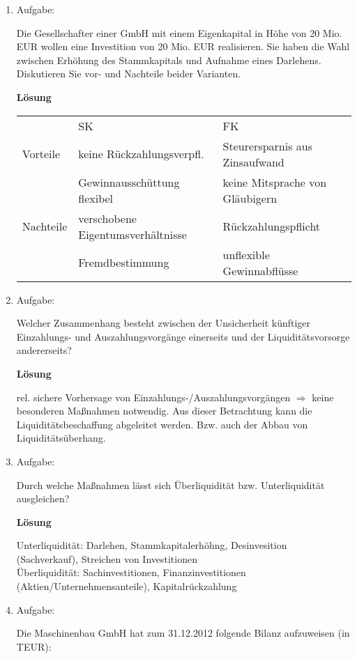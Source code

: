 \documentclass[12pt,a4paper]{scrreprt}
\newcommand{\Lsg}{\textbf{Lösung}\nobreak}
\begin{document}
\begin{enumerate}
 	\item{Aufgabe:}

Die Gesellschafter einer GmbH mit einem Eigenkapital in Höhe von 20 Mio. EUR wollen eine Investition von 20 Mio. EUR realisieren. Sie haben die Wahl zwischen Erhöhung des Stammkapitals und Aufnahme eines Darlehens. Diskutieren Sie vor- und Nachteile beider Varianten.

\Lsg

\begin{tabular}{lll}
 & SK & FK \\
Vorteile & keine Rückzahlungsverpfl. & Steurersparnis aus Zinsaufwand	\\
	& Gewinnausschüttung flexibel & keine Mitsprache von Gläubigern	\\
Nachteile	& verschobene Eigentumsverhältnisse	& Rückzahlungspflicht	\\
	& Fremdbestimmung	&	unflexible Gewinnabflüsse
\end{tabular}

 	\item{Aufgabe:}

Welcher Zusammenhang besteht zwischen der Unsicherheit künftiger Einzahlungs- und Auszahlungsvorgänge einerseits und der Liquiditätsvorsorge andererseits?

\Lsg

rel. sichere Vorhersage von Einzahlungs-/Auszahlungsvorgängen $\Rightarrow$ keine besonderen Maßnahmen notwendig.
Aus dieser Betrachtung kann die Liquiditätsbeschaffung abgeleitet werden.
Bzw. auch der Abbau von Liquiditätsüberhang.

 	\item{Aufgabe:}

Durch welche Maßnahmen lässt sich Überliquidität bzw. Unterliquidität ausgleichen?

\Lsg

Unterliquidität: Darlehen, Stammkapitalerhöhng, Desinvesition (Sachverkauf), Streichen von Investitionen \\
Überliquidität: Sachinvestitionen, Finanzinvestitionen (Aktien/Unternehmensanteile), Kapitalrückzahlung

 	\item{Aufgabe:}

Die Maschinenbau GmbH hat zum 31.12.2012 folgende Bilanz aufzuweisen (in TEUR):


\end{enumerate}
\end{document}
